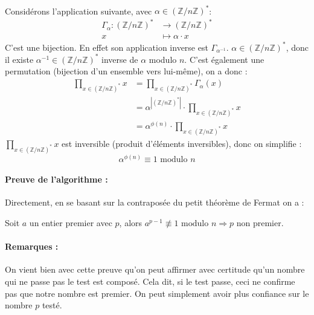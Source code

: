 			\paragraph{}Considérons l'application suivante, avec $\alpha \in (\mathbb{Z}/n\mathbb{Z})^*$:
				\begin{align*}
					\Gamma_{\alpha} \colon (\mathbb{Z}/n\mathbb{Z})^* &\to (\mathbb{Z}/n\mathbb{Z})^*\\
					x &\mapsto \alpha \cdot x
				\end{align*}
				C'est une bijection. En effet son application inverse est $\Gamma_{\alpha^{-1}}$. $\alpha \in (\mathbb{Z}/n\mathbb{Z})^*$, donc il existe $\alpha^{-1} \in (\mathbb{Z}/n\mathbb{Z})^*$ inverse de $\alpha$ modulo $n$. C'est également une permutation (bijection d'un ensemble vers lui-même), on a donc :
				\begin{align*}
					\prod_{x \in (\mathbb{Z}/n\mathbb{Z})^*} x &= \prod_{x \in (\mathbb{Z}/n\mathbb{Z})^*} \Gamma_{\alpha}(x)\\
					&= \alpha^{|(\mathbb{Z}/n\mathbb{Z})^* |} \cdot \prod_{x \in (\mathbb{Z}/n\mathbb{Z})^*} x\\
					&= \alpha^{\phi(n)} \cdot \prod_{x \in (\mathbb{Z}/n\mathbb{Z})^*} x
				\end{align*}
				$\prod_{x \in (\mathbb{Z}/n\mathbb{Z})^*} x$ est inversible (produit d'éléments inversibles), donc on simplifie :
				\[\alpha^{\phi(n)} \equiv 1 \text{ modulo } n \]
		
		\paragraph{Preuve de l'algorithme :\\}
			Directement, en se basant sur la contraposée du petit théorème de Fermat on a :
			\begin{center}
			Soit $a$ un entier premier avec $p$, alors $a^{p-1} \not\equiv 1 \text{ modulo } n \Rightarrow p$ non premier.
			\end{center}
		
		\paragraph{Remarques :\\}
			On vient bien avec cette preuve qu'on peut affirmer avec certitude qu'un nombre qui ne passe pas le test est composé. Cela dit, si le test passe, ceci ne confirme pas que notre nombre est premier. On peut simplement avoir plus confiance sur le nombre $p$ testé.
		
